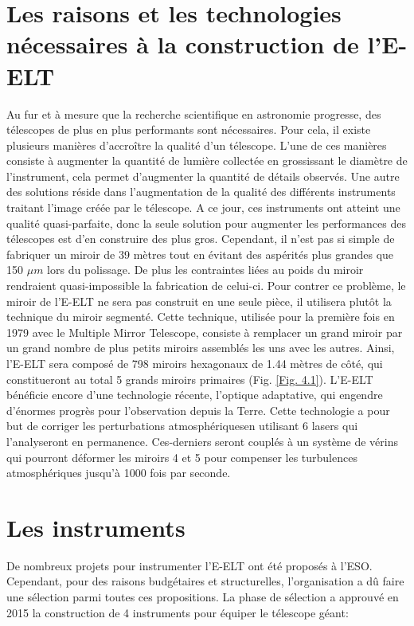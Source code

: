 \section{Les raisons et les technologies nécessaires à la construction de l'E-ELT}\label{4.1}

Au fur et à mesure que la recherche scientifique en astronomie progresse, des télescopes de plus en plus performants sont nécessaires. Pour cela, il existe plusieurs manières d'accroître la qualité d'un télescope. L'une de ces manières consiste à augmenter la quantité de lumière collectée en grossissant le diamètre de l'instrument, cela permet d'augmenter la quantité de détails observés. Une autre des solutions réside dans l'augmentation de la qualité des différents instruments traitant l'image créée par le télescope. A ce jour, ces instruments ont atteint une qualité quasi-parfaite, donc la seule solution pour augmenter les performances des télescopes est d'en construire des plus gros. Cependant, il n'est pas si simple de fabriquer un miroir de 39 mètres tout en évitant des aspérités plus grandes que 150 $\mu m$ lors du polissage. De plus les contraintes liées au poids du miroir rendraient quasi-impossible la fabrication de celui-ci. Pour contrer ce problème, le miroir de l'E-ELT ne sera pas construit en une seule pièce, il utilisera plutôt la technique du miroir segmenté. Cette technique, utilisée pour la première fois en 1979 avec le Multiple Mirror Telescope, consiste à remplacer un grand miroir par un grand nombre de plus petits miroirs assemblés les uns avec les autres. Ainsi, l'E-ELT sera composé de 798 miroirs hexagonaux de 1.44 mètres de côté, qui constitueront au total 5 grands miroirs primaires (Fig. \ref{Fig. 4.1}). L'E-ELT bénéficie encore d'une technologie récente, l'optique adaptative, qui engendre d'énormes progrès pour l'observation depuis la Terre. Cette technologie a pour but de corriger les perturbations atmosphériques\footnotemark[1] en utilisant 6 lasers qui l'analyseront en permanence. Ces-derniers seront couplés à un système de vérins qui pourront déformer les miroirs 4 et 5 pour compenser les turbulences atmosphériques jusqu'à 1000 fois par seconde.

\section{Les instruments}\label{4.2}

De nombreux projets pour instrumenter l'E-ELT ont été proposés à l'ESO. Cependant, pour des raisons budgétaires et structurelles, l'organisation a dû faire une sélection parmi toutes ces propositions. La phase de sélection a approuvé en 2015 la construction de 4 instruments pour équiper le télescope géant:

